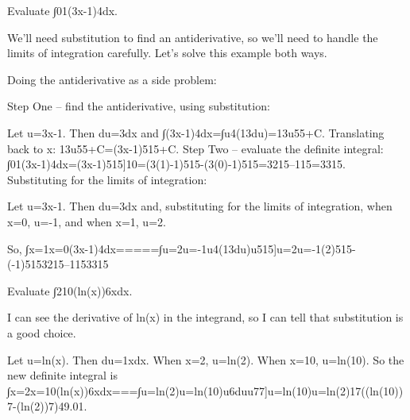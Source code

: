 \begin{example}
Evaluate ∫01(3x-1)4dx.

\begin{solution}
We'll need substitution to find an antiderivative, so we'll need to handle the limits of integration carefully. Let's solve this example both ways.

Doing the antiderivative as a side problem:

Step One – find the antiderivative, using substitution:

Let u=3x-1. Then du=3dx and
∫(3x-1)4dx=∫u4(13du)=13u55+C.
Translating back to x:
13u55+C=(3x-1)515+C.
Step Two – evaluate the definite integral:
∫01(3x-1)4dx=(3x-1)515]10=(3(1)-1)515-(3(0)-1)515=3215--115=3315.
Substituting for the limits of integration:

Let u=3x-1. Then du=3dx and, substituting for the limits of integration, when x=0, u=-1, and when x=1, u=2.

So,
∫x=1x=0(3x-1)4dx=====∫u=2u=-1u4(13du)u515]u=2u=-1(2)515-(-1)5153215--1153315
\end{solution}\end{example}

\begin{example} 
Evaluate ∫210(ln(x))6xdx.

\begin{solution}
  I can see the derivative of ln(x) in the integrand, so I can tell that substitution is a good choice.

Let u=ln(x). Then du=1xdx. When x=2, u=ln(2). When x=10, u=ln(10). So the new definite integral is
∫x=2x=10(ln(x))6xdx===\approx   ∫u=ln(2)u=ln(10)u6duu77]u=ln(10)u=ln(2)17((ln(10))7-(ln(2))7)49.01.
\end{solution}\end{example}
